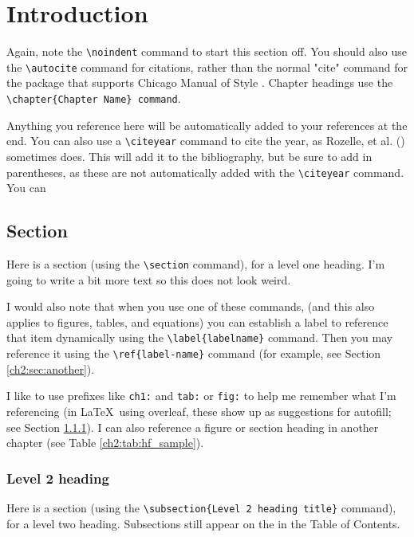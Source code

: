 \chapter{Introduction}

\noindent Again, note the \texttt{\textbackslash noindent} command to start this section off. You should also use the \texttt{\textbackslash autocite} command for citations, rather than the normal "cite" command for the package that supports Chicago Manual of Style \autocite{rozelle_effect_2023}. Chapter headings use the \texttt{\textbackslash chapter\{Chapter Name\} command}.

Anything you reference here will be automatically added to your references at the end. You can also use a \texttt{\textbackslash citeyear} command to cite the year, as Rozelle, et al. (\citeyear{rozelle_effect_2023}) sometimes does. This will add it to the bibliography, but be sure to add in parentheses, as these are not automatically added with the \texttt{\textbackslash citeyear} command. You can 

\section{Section}

Here is a section (using the \texttt{\textbackslash section} command), for a level one heading. I'm going to write a bit more text so this does not look weird.

I would also note that when you use one of these commands, (and this also applies to figures, tables, and equations) you can establish a label to reference that item dynamically using the \texttt{\textbackslash label\{labelname\}} command. Then you may reference it using the \texttt{\textbackslash ref\{label-name\}} command (for example, see Section \ref{ch2:sec:another}).

I like to use prefixes like \texttt{ch1:} and \texttt{tab:} or \texttt{fig:} to help me remember what I'm referencing (in \LaTeX~using overleaf, these show up as suggestions for autofill; see Section \ref{ch1:subsec:lvl2heading}). I can also reference a figure or section heading in another chapter (see Table \ref{ch2:tab:hf_sample}).

\subsection{Level 2 heading}
\label{ch1:subsec:lvl2heading}

Here is a section (using the \texttt{\textbackslash subsection\{Level 2 heading title\}} command), for a level two heading. Subsections still appear on the in the Table of Contents.

